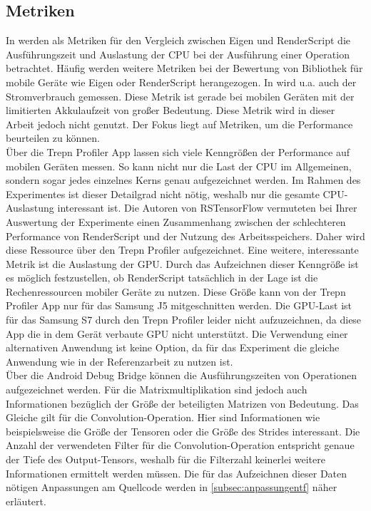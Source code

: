 \subsection{Metriken}
\label{subsec:metriken}
In \cite{rstensorflow2017} werden als Metriken für den Vergleich zwischen Eigen und RenderScript die Ausführungszeit und Auslastung der CPU bei der Ausführung einer Operation betrachtet. Häufig werden weitere Metriken bei der Bewertung von Bibliothek für mobile Geräte wie Eigen oder RenderScript herangezogen. In \cite{deepmon2017} wird u.a. auch der Stromverbrauch gemessen. Diese Metrik ist gerade bei mobilen Geräten mit der limitierten Akkulaufzeit von großer Bedeutung. Diese Metrik wird in dieser Arbeit jedoch nicht genutzt. Der Fokus liegt auf Metriken, um die Performance beurteilen zu können. 
\\
Über die Trepn Profiler App lassen sich viele Kenngrößen der Performance auf mobilen Geräten messen. So kann nicht nur die Last der CPU im Allgemeinen, sondern sogar jedes einzelnes Kerns genau aufgezeichnet werden. Im Rahmen des Experimentes ist dieser Detailgrad nicht nötig, weshalb nur die gesamte CPU-Auslastung interessant ist. Die Autoren von RSTensorFlow vermuteten bei Ihrer Auswertung der Experimente einen Zusammenhang zwischen der schlechteren Performance von RenderScript und der Nutzung des Arbeitsspeichers. Daher wird diese Ressource über den Trepn Profiler aufgezeichnet. Eine weitere, interessante Metrik ist die Auslastung der GPU. Durch das Aufzeichnen dieser Kenngröße ist es möglich festzustellen, ob RenderScript tatsächlich in der Lage ist die Rechenressourcen mobiler Geräte zu nutzen. Diese Größe kann von der Trepn Profiler App nur für das Samsung J5 mitgeschnitten werden. Die GPU-Last ist für das Samsung S7 durch den Trepn Profiler leider nicht aufzuzeichnen, da diese App die in dem Gerät verbaute GPU nicht unterstützt. Die Verwendung einer alternativen Anwendung ist keine Option, da für das Experiment die gleiche Anwendung wie in der Referenzarbeit zu nutzen ist. 
\\
Über die Android Debug Bridge können die Ausführungszeiten von Operationen aufgezeichnet werden. Für die Matrixmultiplikation sind jedoch auch Informationen bezüglich der Größe der beteiligten Matrizen von Bedeutung. Das Gleiche gilt für die Convolution-Operation. Hier sind Informationen wie beispielsweise die Größe der Tensoren oder die Größe des Strides interessant. Die Anzahl der verwendeten Filter für die Convolution-Operation entspricht genaue der Tiefe des Output-Tensors, weshalb für die Filterzahl keinerlei weitere Informationen ermittelt werden müssen. Die für das Aufzeichnen dieser Daten nötigen Anpassungen am Quellcode werden in \ref{subsec:anpassungentf} näher erläutert. 


